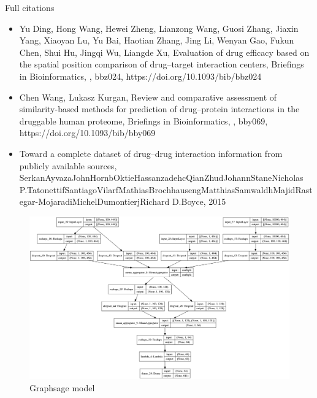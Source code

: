 \documentclass[10pt]{beamer}
\begin{document}
\begin{frame}{Full citations}
	\footnotesize
	\begin{itemize}
		\item Yu Ding, Hong Wang, Hewei Zheng, Lianzong Wang, Guosi Zhang, Jiaxin Yang, Xiaoyan Lu, Yu Bai, Haotian Zhang, Jing Li, Wenyan Gao, Fukun Chen, Shui Hu, Jingqi Wu, Liangde Xu, Evaluation of drug efficacy based on the spatial position comparison of drug–target interaction centers, Briefings in Bioinformatics, , bbz024, https://doi.org/10.1093/bib/bbz024
		\item Chen Wang, Lukasz Kurgan, Review and comparative assessment of similarity-based methods for prediction of drug–protein interactions in the druggable human proteome, Briefings in Bioinformatics, , bby069, https://doi.org/10.1093/bib/bby069
		\item Toward a complete dataset of drug–drug interaction information from publicly available sources, SerkanAyvazaJohnHornbOktieHassanzadehcQianZhudJohannStaneNicholas P.TatonettifSantiagoVilarfMathiasBrochhausengMatthiasSamwaldhMajidRastegar-MojaradiMichelDumontierjRichard D.Boyce, 2015
		
	\end{itemize}
\end{frame}

\begin{frame}
	\begin{figure}
		\includegraphics[width=\linewidth]{../../models/graphsage_model.png}
		\caption{Graphsage model}
	\end{figure}
\end{frame}
\end{document}
